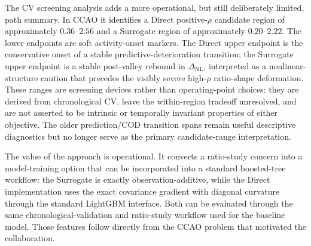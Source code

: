 \documentclass[10pt]{article}
\theoremstyle{definition}
\newcommand{\1}{\mathbf{1}}
\newcommand{\advisorchange}[1]{{\color{blue}#1}}
\newcommand{\oldtext}[1]{\textcolor{blue}{\sout{#1}}}
\newcommand{\newtext}[1]{\textcolor{impGreen}{#1}}
\newcommand{\latesttext}[1]{\textcolor{latestPurple}{#1}}
\begin{document}
\latesttext{The CV screening analysis adds a more operational, but still deliberately limited, path summary. In CCAO it identifies a Direct positive-$\rho$ candidate region of approximately $0.36$--$2.56$ and a Surrogate region of approximately $0.20$--$2.22$. The lower endpoints are soft activity-onset markers. The Direct upper endpoint is the conservative onset of a stable predictive-deterioration transition; the Surrogate upper endpoint is a stable post-valley rebound in $\Delta_{\mathrm{NL}}$, interpreted as a nonlinear-structure caution that precedes the visibly severe high-$\rho$ ratio-shape deformation. These ranges are screening devices rather than operating-point choices: they are derived from chronological CV, leave the within-region tradeoff unresolved, and are not asserted to be intrinsic or temporally invariant properties of either objective. The older prediction/COD transition spans remain useful descriptive diagnostics but no longer serve as the primary candidate-range interpretation.}

\newtext{The value of the approach is operational. It converts a ratio-study concern into a model-training option that can be incorporated into a standard boosted-tree workflow: the Surrogate is exactly observation-additive, while the Direct implementation uses the exact covariance gradient with diagonal curvature through the standard LightGBM interface. Both can be evaluated through the same chronological-validation and ratio-study workflow used for the baseline model.} \advisorchange{Those features follow directly from the CCAO problem that motivated the collaboration.}

\end{document}
